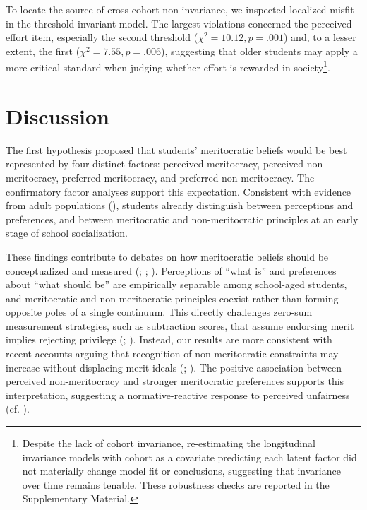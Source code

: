 \documentclass[
  13pt,
]{article}
\begin{document}
To locate the source of cross-cohort non-invariance, we inspected
localized misfit in the threshold-invariant model. The largest
violations concerned the perceived-effort item, especially the second
threshold (\(\chi^2=10.12, p=.001\)) and, to a lesser extent, the first
(\(\chi^2=7.55, p=.006\)), suggesting that older students may apply a
more critical standard when judging whether effort is rewarded in
society\footnote{Despite the lack of cohort invariance, re-estimating
  the longitudinal invariance models with cohort as a covariate
  predicting each latent factor did not materially change model fit or
  conclusions, suggesting that invariance over time remains tenable.
  These robustness checks are reported in the Supplementary Material.}.

\section{Discussion}\label{discussion}

The first hypothesis proposed that students' meritocratic beliefs would
be best represented by four distinct factors: perceived meritocracy,
perceived non-meritocracy, preferred meritocracy, and preferred
non-meritocracy. The confirmatory factor analyses support this
expectation. Consistent with evidence from adult populations
(),
students already distinguish between perceptions and preferences, and
between meritocratic and non-meritocratic principles at an early stage
of school socialization.

These findings contribute to debates on how meritocratic beliefs should
be conceptualized and measured
(;
;
). Perceptions of ``what
is'' and preferences about ``what should be'' are empirically separable
among school-aged students, and meritocratic and non-meritocratic
principles coexist rather than forming opposite poles of a single
continuum. This directly challenges zero-sum measurement strategies,
such as subtraction scores, that assume endorsing merit implies
rejecting privilege (; ). Instead, our results are more consistent with recent accounts
arguing that recognition of non-meritocratic constraints may increase
without displacing merit ideals (; ).
The positive association between perceived non-meritocracy and stronger
meritocratic preferences supports this interpretation, suggesting a
normative-reactive response to perceived unfairness (cf.
).
\end{document}
